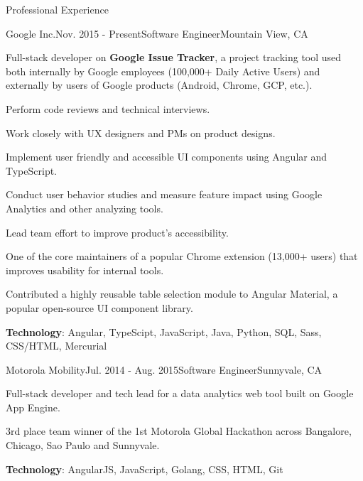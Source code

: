 \documentclass{resume} %
\begin{document}
\begin{rSection}{Professional Experience}

\begin{rSubsection}{Google Inc.}{Nov. 2015 - Present}{Software Engineer}{Mountain View, CA}
\item Full-stack developer on \textbf{Google Issue Tracker}, a project tracking tool used both internally by Google employees (100,000+ Daily Active Users) and externally by users of Google products (Android, Chrome, GCP, etc.).
\item Perform code reviews and technical interviews.
\item Work closely with UX designers and PMs on product designs.
\item Implement user friendly and accessible UI components using Angular and TypeScript. 
\item Conduct user behavior studies and measure feature impact using Google Analytics and other analyzing tools.
\item Lead team effort to improve product's accessibility.
\item One of the core maintainers of a popular Chrome extension (13,000+ users) that improves usability for internal tools.
\item Contributed a highly reusable table selection module to Angular Material, a popular open-source UI component library.
\item \textbf{Technology}: Angular, TypeScipt, JavaScript, Java, Python, SQL, Sass, CSS/HTML, Mercurial

\end{rSubsection}

\begin{rSubsection}{Motorola Mobility}{Jul. 2014 - Aug. 2015}{Software Engineer}{Sunnyvale, CA}
\item Full-stack developer and tech lead for a data analytics web tool built on Google App Engine.
\item 3rd place team winner of the 1st Motorola Global Hackathon across Bangalore, Chicago, Sao Paulo and Sunnyvale.
\item \textbf{Technology}: AngularJS, JavaScript, Golang, CSS, HTML, Git
\end{rSubsection}


\end{rSection}
\end{document}
